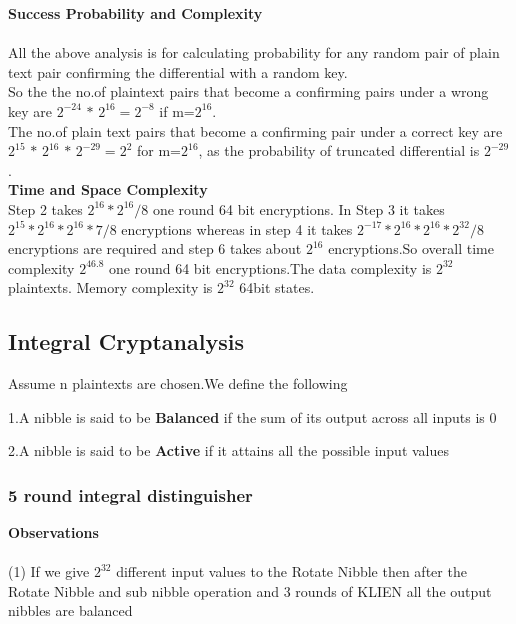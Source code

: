\documentclass[preprint]{transcrypto}
\begin{document}
\textbf{Success Probability and Complexity} \\ \\
All the above analysis is for calculating probability for any random pair of plain text pair confirming the differential with a random key.\\
So the the no.of plaintext pairs that become a confirming pairs under a wrong key are $2^{-24}\,*\,2^{16} = 2^{-8}$ if m=$2^{16}$.\\
The no.of plain text pairs that become a confirming pair under a correct key are $2^{15}\,*\,2^{16}\,*\,2^{-29} = 2^{2}$ for m=$2^{16}$, as the probability of truncated differential is $2^{-29}$.\\ 
\textbf{Time and Space Complexity} \\
Step 2 takes $2^{16}*2^{16}/8$ one round 64 bit encryptions. In Step 3 it takes $2^{15}*2^{16}*2^{16}*7/8$ encryptions whereas in step 4 it takes $2^{-17}*2^{16}*2^{16}*2^{32}/8$ encryptions are required and step 6 takes about $2^{16}$ encryptions.So overall time complexity $2^{46.8}$ one round 64 bit encryptions.The data complexity is $2^{32}$ plaintexts. Memory complexity is $2^{32}$ 64bit states. 



\subsection{Integral Cryptanalysis}

Assume n plaintexts are chosen.We define the following 

1.A nibble is said to be \textbf{Balanced} if the sum of its output across all inputs is 0

2.A nibble is said to be \textbf{Active} if it attains all the possible input values 

\subsubsection{5 round integral distinguisher}

\textbf{Observations}\\ \\

(1) If we give $2^{32}$ different input values to the Rotate Nibble then after the Rotate Nibble and sub nibble operation and 3 rounds of KLIEN all the output nibbles are balanced \\ \\
\end{document}
